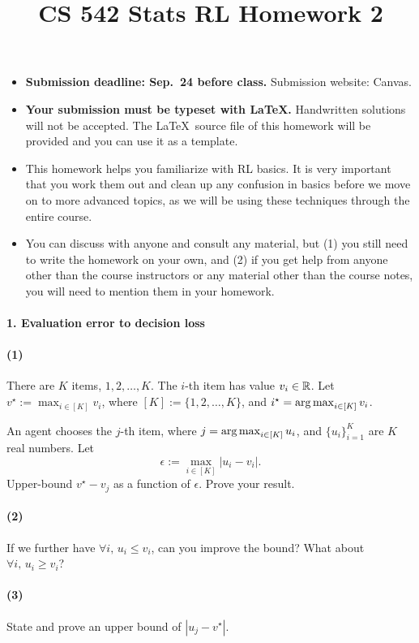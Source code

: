 \documentclass{article}
\title{CS 542 Stats RL Homework 2}
\begin{document}

\begin{itemize}
\item \textbf{Submission deadline: Sep.~24 before class.} Submission website: Canvas.
\item \textbf{Your submission must be typeset with \LaTeX.} Handwritten solutions will not be accepted. The \LaTeX~source file of this homework will be provided and you can use it as a template.
\item This homework helps you familiarize with RL basics. It is very important that you work them out and clean up any confusion in basics before we move on to more advanced topics, as we will be using these techniques through the entire course. 
\item You can discuss with anyone and consult any material, but (1) you still need to write the homework on your own, and (2) if you get help from anyone other than the course instructors or any material other than the course notes, you will need to mention them in your homework. 
\end{itemize}

\paragraph{1. Evaluation error to decision loss}
\paragraph{(1)}
There are $K$ items, $1, 2, \ldots, K$. The $i$-th item has value $v_i \in \mathbb{R}$. Let $v^\star := \max_{i\in[K]} v_i$, where $[K]:= \{1, 2, \ldots, K\}$, and $i^\star = \operatorname*{arg\,max}_{i\in[K]} v_i$. 

An agent chooses the $j$-th item, where $j = \operatorname*{arg\,max}_{i\in[K]} u_i$, and $\{u_i\}_{i=1}^K$ are $K$ real numbers. Let 
$$
\epsilon:= \max_{i\in[K]} |u_i - v_i|.
$$
Upper-bound $v^\star - v_j$ as a function of $\epsilon$. Prove your result.


\paragraph{(2)}
If we further have $\forall i, \, u_i \le v_i$, can you improve the bound? What about $\forall i, \, u_i \ge v_i$?

\paragraph{(3)}
State and prove an upper bound of $|u_j - v^\star|$.
\end{document}
